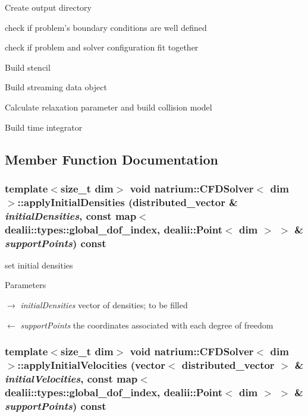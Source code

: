 Create output directory

check if problem's boundary conditions are well defined

check if problem and solver configuration fit together

Build stencil

Build streaming data object

Calculate relaxation parameter and build collision model

Build time integrator 

\subsection{Member Function Documentation}
\hypertarget{classnatrium_1_1CFDSolver_a36146c0f8a6c5abd0ebec4c49f2a4e6d}{
\subsubsection[{applyInitialDensities}]{\setlength{\rightskip}{0pt plus 5cm}template$<$size\_\-t dim$>$ void {\bf natrium::CFDSolver}$<$ dim $>$::applyInitialDensities ({\bf distributed\_\-vector} \& {\em initialDensities}, \/  const map$<$ dealii::types::global\_\-dof\_\-index, dealii::Point$<$ dim $>$ $>$ \& {\em supportPoints}) const}}
\label{classnatrium_1_1CFDSolver_a36146c0f8a6c5abd0ebec4c49f2a4e6d}


set initial densities 
\begin{DoxyParams}{Parameters}
\item[\mbox{$\rightarrow$} {\em initialDensities}]vector of densities; to be filled \item[\mbox{$\leftarrow$} {\em supportPoints}]the coordinates associated with each degree of freedom \end{DoxyParams}
\hypertarget{classnatrium_1_1CFDSolver_afd82bfa5e1e613ef99b9b870cb73db0e}{
\subsubsection[{applyInitialVelocities}]{\setlength{\rightskip}{0pt plus 5cm}template$<$size\_\-t dim$>$ void {\bf natrium::CFDSolver}$<$ dim $>$::applyInitialVelocities (vector$<$ {\bf distributed\_\-vector} $>$ \& {\em initialVelocities}, \/  const map$<$ dealii::types::global\_\-dof\_\-index, dealii::Point$<$ dim $>$ $>$ \& {\em supportPoints}) const}}
\label{classnatrium_1_1CFDSolver_afd82bfa5e1e613ef99b9b870cb73db0e}


